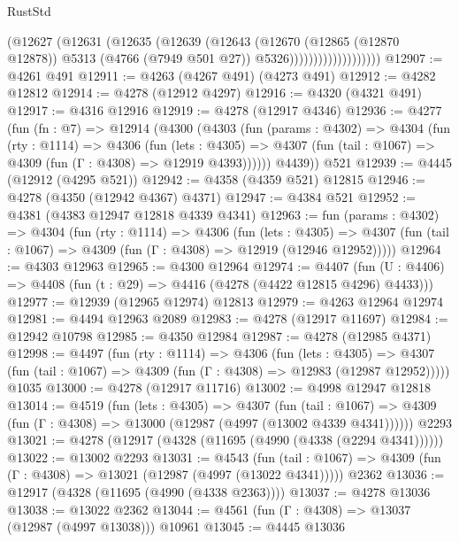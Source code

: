 \begin{lexlean}{RustStd}
\begin{coremodule}
                              (@12627
                                (@12631
                                  (@12635
                                    (@12639
                                      (@12643
                                        (@12670
                                          (@12865 (@12870 @12878))
                                          @5313
                                          (@4766 (@7949 @501 @27))
                                          @5326)))))))))))))))))))
@12907 := @4261 @491
@12911 := @4263 (@4267 @491) (@4273 @491)
@12912 := @4282 @12812
@12914 := @4278 (@12912 @4297)
@12916 := @4320 (@4321 @491)
@12917 := @4316 @12916
@12919 := @4278 (@12917 @4346)
@12936 := @4277
    (fun (fn : @7) =>
    @12914
      (@4300
        (@4303
          (fun (params : @4302) =>
          @4304
            (fun (rty : @1114) =>
            @4306
              (fun (lets : @4305) =>
              @4307 (fun (tail : @1067) => @4309 (fun (Γ : @4308) => @12919 @4393))))))
        @4439))
    @521
@12939 := @4445 (@12912 (@4295 @521))
@12942 := @4358 (@4359 @521) @12815
@12946 := @4278 (@4350 (@12942 @4367) @4371)
@12947 := @4384 @521
@12952 := @4381 (@4383 @12947 @12818 @4339 @4341)
@12963 := fun (params : @4302) =>
  @4304
    (fun (rty : @1114) =>
    @4306
      (fun (lets : @4305) =>
      @4307 (fun (tail : @1067) => @4309 (fun (Γ : @4308) => @12919 (@12946 @12952)))))
@12964 := @4303 @12963
@12965 := @4300 @12964
@12974 := @4407
    (fun (U : @4406) => @4408 (fun (t : @29) => @4416 (@4278 (@4422 @12815 @4296) @4433)))
@12977 := @12939 (@12965 @12974) @12813
@12979 := @4263 @12964 @12974
@12981 := @4494 @12963 @2089
@12983 := @4278 (@12917 @11697)
@12984 := @12942 @10798
@12985 := @4350 @12984
@12987 := @4278 (@12985 @4371)
@12998 := @4497
    (fun (rty : @1114) =>
    @4306
      (fun (lets : @4305) =>
      @4307 (fun (tail : @1067) => @4309 (fun (Γ : @4308) => @12983 (@12987 @12952)))))
    @1035
@13000 := @4278 (@12917 @11716)
@13002 := @4998 @12947 @12818
@13014 := @4519
    (fun (lets : @4305) =>
    @4307
      (fun (tail : @1067) =>
      @4309 (fun (Γ : @4308) => @13000 (@12987 (@4997 (@13002 @4339 @4341))))))
    @2293
@13021 := @4278 (@12917 (@4328 (@11695 (@4990 (@4338 (@2294 @4341))))))
@13022 := @13002 @2293
@13031 := @4543
    (fun (tail : @1067) => @4309 (fun (Γ : @4308) => @13021 (@12987 (@4997 (@13022 @4341)))))
    @2362
@13036 := @12917 (@4328 (@11695 (@4990 (@4338 @2363))))
@13037 := @4278 @13036
@13038 := @13022 @2362
@13044 := @4561 (fun (Γ : @4308) => @13037 (@12987 (@4997 @13038))) @10961
@13045 := @4445 @13036

\end{coremodule}
\end{lexlean}
